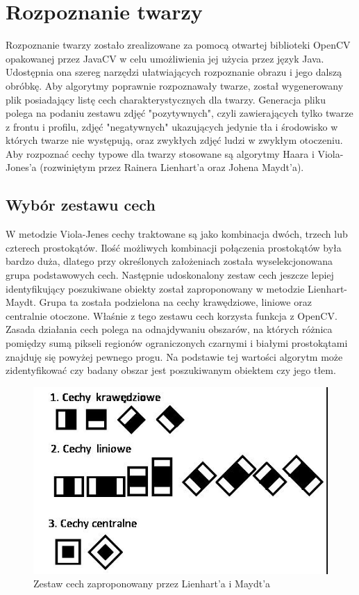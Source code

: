 \section{Rozpoznanie twarzy}
Rozpoznanie twarzy zostało zrealizowane za pomocą otwartej biblioteki OpenCV opakowanej przez JavaCV w celu umożliwienia jej użycia przez język Java. Udostępnia ona szereg narzędzi ułatwiających rozpoznanie obrazu i jego dalszą obróbkę. Aby algorytmy poprawnie rozpoznawały twarze, został wygenerowany plik posiadający listę cech charakterystycznych dla twarzy. Generacja pliku polega na podaniu zestawu zdjęć "pozytywnych", czyli zawierających tylko twarze z frontu i profilu, zdjęć "negatywnych" ukazujących jedynie tła i środowisko w których twarze nie występują, oraz zwykłych zdjęć ludzi w zwykłym otoczeniu. 
Aby rozpoznać cechy typowe dla twarzy stosowane są algorytmy Haara i Viola-Jones'a (rozwiniętym przez Rainera Lienhart'a oraz Johena Maydt’a).

\subsection{Wybór zestawu cech}
W metodzie Viola-Jenes cechy traktowane są jako kombinacja dwóch, trzech lub czterech prostokątów. Ilość możliwych kombinacji połączenia prostokątów była bardzo duża, dlatego przy określonych założeniach została wyselekcjonowana grupa podstawowych cech. Następnie udoskonalony zestaw cech jeszcze lepiej identyfikujący poszukiwane obiekty został zaproponowany w metodzie Lienhart-Maydt. Grupa ta została podzielona na cechy krawędziowe, liniowe oraz centralnie otoczone. Właśnie z tego zestawu cech korzysta funkcja z OpenCV. Zasada działania cech polega na odnajdywaniu obszarów, na których różnica pomiędzy sumą pikseli regionów ograniczonych czarnymi i białymi prostokątami znajduję się powyżej pewnego progu. Na podstawie tej wartości algorytm może zidentyfikować czy badany obszar jest poszukiwanym obiektem czy jego tłem.

\begin{figure}[h]
\centering
\includegraphics[scale=0.6]{./violajones.jpg}
\caption[Cechy rozpoznawane przez OpenCV]{Zestaw cech zaproponowany przez Lienhart'a i Maydt'a}
\end{figure}

